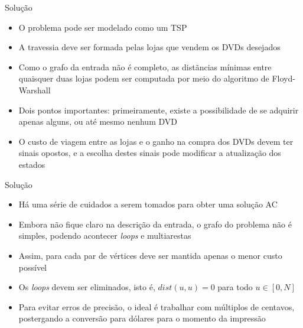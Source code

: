 \begin{frame}[fragile]{Solução}

    \begin{itemize}
        \item O problema pode ser modelado como um TSP

        \item A travessia deve ser formada pelas lojas que vendem os DVDs desejados

        \item Como o grafo da entrada não é completo, as distãncias mínimas entre quaisquer duas
            lojas podem ser computada por meio do algoritmo de Floyd-Warshall

        \item Dois pontos importantes: primeiramente, existe a possibilidade de se adquirir
            apenas alguns, ou até mesmo nenhum DVD

        \item O custo de viagem entre as lojas e o ganho na compra dos DVDs devem ter sinais
            opostos, e a escolha destes sinais pode modificar a atualização dos estados
    \end{itemize}

\end{frame}

\begin{frame}[fragile]{Solução}

    \begin{itemize}
        \item Há uma série de cuidados a serem tomados para obter uma solução AC

        \item Embora não fique claro na descrição da entrada, o grafo do problema não é 
            simples, podendo acontecer \textit{loops} e multiarestas

        \item Assim, para cada par de vértices deve ser mantida apenas o menor custo possível

        \item Os \textit{loops} devem ser eliminados, isto é, $dist(u, u) = 0$ para todo 
            $u\in [0, N]$
        
        \item Para evitar erros de precisão, o ideal é trabalhar com múltiplos de centavos,
            postergando a conversão para dólares para o momento da impressão
   \end{itemize}

\end{frame}

